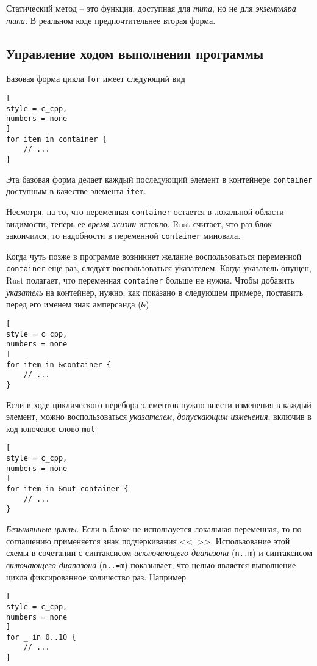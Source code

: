 \documentclass[%
	11pt,
	a4paper,
	utf8,
		]{article}
\begin{document}
Статический метод -- это функция, доступная для \emph{типа}, но не для \emph{экземпляра типа}. В реальном коде предпочтительнее вторая форма.

\subsection{Управление ходом выполнения программы}

Базовая форма цикла \texttt{for} имеет следующий вид
\begin{lstlisting}[
style = c_cpp,
numbers = none
]
for item in container {
    // ...
}
\end{lstlisting}

Эта базовая форма делает каждый последующий элемент в контейнере \texttt{container} доступным в качестве элемента \texttt{item}.

Несмотря, на то, что переменная \texttt{container} остается в локальной области видимости, теперь ее \emph{время жизни} истекло. Rust считает, что раз блок закончился, то надобности в переменной \texttt{container} миновала.

Когда чуть позже в программе возникнет желание воспользоваться переменной \texttt{container} еще раз, следует воспользоваться указателем. Когда указатель опущен, Rust полагает, что переменная \texttt{container} больше не нужна. Чтобы добавить \emph{указатель} на контейнер, нужно, как показано в следующем примере, поставить перед его именем знак амперсанда (\verb|&|)
\begin{lstlisting}[
style = c_cpp,
numbers = none
]
for item in &container {
    // ...
}
\end{lstlisting}

Если в ходе циклического перебора элементов нужно внести изменения в каждый элемент, можно воспользоваться \emph{указателем}, \emph{допускающим изменения}, включив в код ключевое слово \texttt{mut}
\begin{lstlisting}[
style = c_cpp,
numbers = none
]
for item in &mut container {
    // ...
}
\end{lstlisting}

\emph{Безымянные циклы}. Если в блоке не используется локальная переменная, то по соглашению применяется знак подчеркивания <<\verb|_|>>. Использование этой схемы в сочетании с синтаксисом \emph{исключающего диапазона} (\verb|n..m|) и синтаксисом \emph{включающего диапазона} (\verb|n..=m|) показывает, что целью является выполнение цикла фиксированное количество раз. Например
\begin{lstlisting}[
style = c_cpp,
numbers = none
]
for _ in 0..10 {
    // ...
}
\end{lstlisting}
\end{document}
